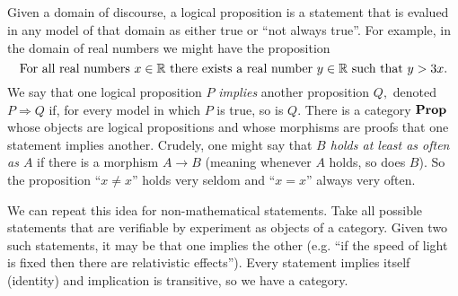 \documentclass[../main/CT4S-EN-RU]{subfiles}
\begin{document}
\begin{exerciseRUS}
\end{exerciseRUS}


\subsection{}


\subsubsection{}\label{sec:propositions}

\begin{blockENG}
Given a domain of discourse, a logical proposition is a statement that is evalued in any model of that domain as either true or “not always true”. For example, in the domain of real numbers we might have the proposition 
$$\textnormal{For all real numbers }x\in{\mathbb R}\textnormal{ there exists a real number } y\in{\mathbb R}\textnormal{ such that }y>3x.$$
We say that one logical proposition $P$ {\em implies} another proposition $Q,$ denoted $P\Rightarrow Q$ if, for every model in which $P$ is true, so is $Q.$ There is a category ${\mathbf{Prop}}$ whose objects are logical propositions and whose morphisms are proofs that one statement implies another. Crudely, one might say that {\em $B$ holds at least as often as $A$} if there is a morphism $A\to B$ (meaning whenever $A$ holds, so does $B$). So the proposition “$x\neq x$” holds very seldom and “$x=x$” always very often.
\end{blockENG}

\begin{blockRUS}
\end{blockRUS}

\begin{exampleENG}
We can repeat this idea for non-mathematical statements. Take all possible statements that are verifiable by experiment as objects of a category. Given two such statements, it may be that one implies the other (e.g. “if the speed of light is fixed then there are relativistic effects”). Every statement implies itself (identity) and implication is transitive, so we have a category. 
\end{exampleENG}
\end{document}
